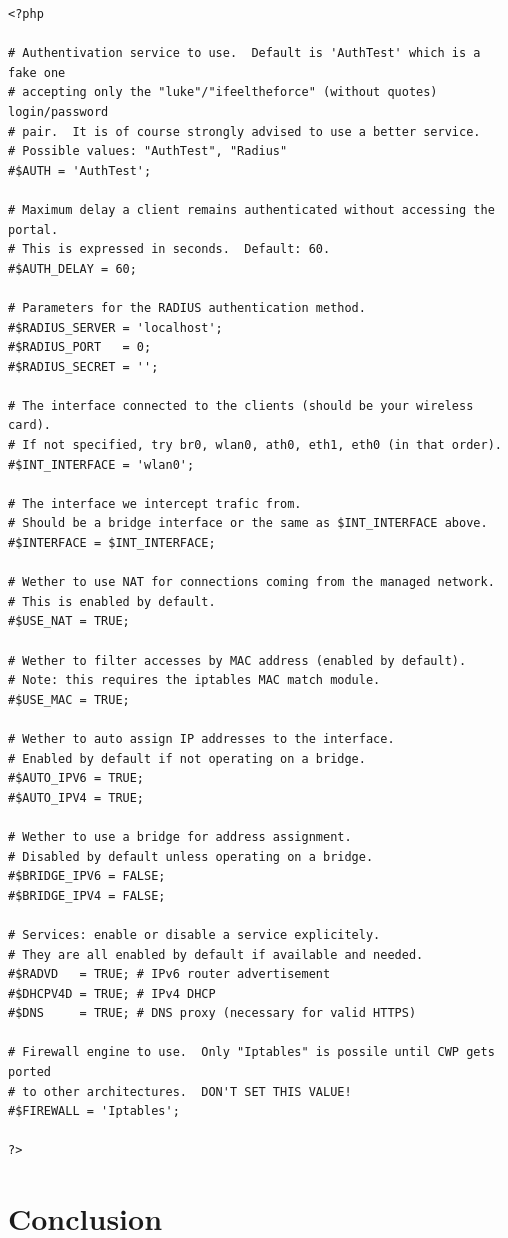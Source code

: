 \documentclass[a4paper,11pt]{report}
\begin{document}
{\small\begin{verbatim}
<?php

# Authentivation service to use.  Default is 'AuthTest' which is a fake one
# accepting only the "luke"/"ifeeltheforce" (without quotes) login/password
# pair.  It is of course strongly advised to use a better service.
# Possible values: "AuthTest", "Radius"
#$AUTH = 'AuthTest';

# Maximum delay a client remains authenticated without accessing the portal.
# This is expressed in seconds.  Default: 60.
#$AUTH_DELAY = 60;

# Parameters for the RADIUS authentication method.
#$RADIUS_SERVER = 'localhost';
#$RADIUS_PORT   = 0;
#$RADIUS_SECRET = '';

# The interface connected to the clients (should be your wireless card).
# If not specified, try br0, wlan0, ath0, eth1, eth0 (in that order).
#$INT_INTERFACE = 'wlan0';

# The interface we intercept trafic from.
# Should be a bridge interface or the same as $INT_INTERFACE above.
#$INTERFACE = $INT_INTERFACE;

# Wether to use NAT for connections coming from the managed network.
# This is enabled by default.
#$USE_NAT = TRUE;

# Wether to filter accesses by MAC address (enabled by default).
# Note: this requires the iptables MAC match module.
#$USE_MAC = TRUE;

# Wether to auto assign IP addresses to the interface.
# Enabled by default if not operating on a bridge.
#$AUTO_IPV6 = TRUE;
#$AUTO_IPV4 = TRUE;

# Wether to use a bridge for address assignment.
# Disabled by default unless operating on a bridge.
#$BRIDGE_IPV6 = FALSE;
#$BRIDGE_IPV4 = FALSE;

# Services: enable or disable a service explicitely.
# They are all enabled by default if available and needed.
#$RADVD   = TRUE; # IPv6 router advertisement
#$DHCPV4D = TRUE; # IPv4 DHCP
#$DNS     = TRUE; # DNS proxy (necessary for valid HTTPS)

# Firewall engine to use.  Only "Iptables" is possile until CWP gets ported
# to other architectures.  DON'T SET THIS VALUE!
#$FIREWALL = 'Iptables';

?>
\end{verbatim}}


\chapter{Conclusion}
\end{document}
